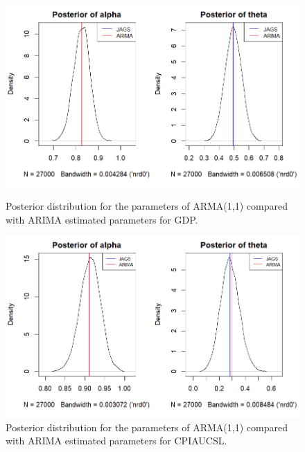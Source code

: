 \begin{figure}[H]
    \centering
    \begin{minipage}{0.49\textwidth}
        \centering
        \includegraphics[width=\textwidth]{images/4-ARMA/ARIMA_ARMA_posterior_distribution_gdp.png}
        \caption{Posterior distribution for the parameters of ARMA(1,1) compared with ARIMA estimated parameters for GDP.}
        \label{fig:ARIMA_ARMA_gdp_posteriors}
    \end{minipage}\hfill
    \begin{minipage}{0.49\textwidth}
        \centering
        \includegraphics[width=\textwidth]{images/4-ARMA/ARIMA_ARMA_posterior_distribution_infl.png}
        \caption{Posterior distribution for the parameters of ARMA(1,1) compared with ARIMA estimated parameters for CPIAUCSL.}
        \label{fig:ARIMA_ARMA_infl_posteriors}
    \end{minipage}
\end{figure}
